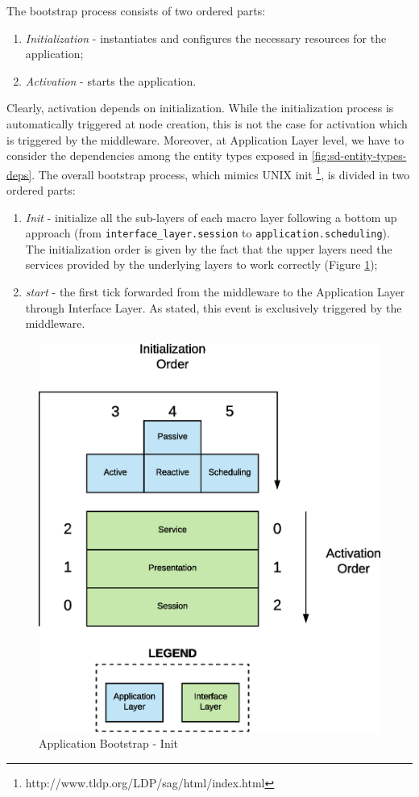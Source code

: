 The bootstrap process consists of two ordered parts:
\begin{enumerate}
	\item \textit{Initialization} - instantiates and configures the necessary resources for the application;
	\item \textit{Activation} - starts the application.
\end{enumerate}
Clearly, activation depends on initialization.
While the initialization process is automatically triggered at node
creation, this is not the case for activation which is triggered by
the middleware.
Moreover, at Application Layer level, we have to consider the
dependencies among the entity types exposed in \ref{fig:sd-entity-types-deps}.
The overall bootstrap process, which mimics UNIX init
\footnote{http://www.tldp.org/LDP/sag/html/index.html},
is divided in two ordered parts:
\begin{enumerate}
	\item \textit{Init} - initialize all the sub-layers of each macro layer
	following a bottom up approach (from \verb|interface_layer.session| to
	\verb|application.scheduling|).
	The initialization order is given by the fact that the upper
	layers need the services provided by the underlying layers to work
	correctly (Figure \ref{fig:sd-app-init});
	\item \textit{start} - the first tick forwarded from the middleware to the
	Application Layer through Interface Layer. As stated, this event is
	exclusively triggered by the middleware.
\end{enumerate}

\begin{figure}[H]
  \centering
  \includegraphics[scale=0.5,keepaspectratio]
    {images/solution/init_activate.eps}
  \caption{Application Bootstrap - Init}
  \label{fig:sd-app-init}
\end{figure}


